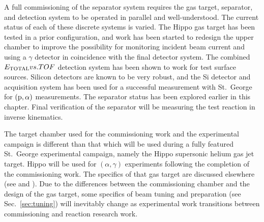 A full commissioning of the separator system requires the gas target,
separator, and detection system to be operated in parallel and well-understood.
The current status of each of these discrete systems is varied. The Hippo gas
target has been tested in a prior configuration, and work has been started to
redesign the upper chamber to improve the possibility for monitoring incident
beam current and using a $\gamma$ detector in coincidence with the final
detector system. The combined $E_{\rm{TOTAL}} vs. TOF$ detection system has
been shown to work for test surface sources. Silicon detectors are known to be
very robust, and the Si detector and acquisition system has been used for
a successful measurement with St.\ George for $(\rm{p},\alpha)$ measurements.
The separator status has been explored earlier in this chapter. Final
verification of the separator will be measuring the test reaction
 in inverse kinematics.

The target chamber used for the commissioning work and the experimental
campaign is different than that which will be used during a fully featured St.\
George experimental campaign, namely the Hippo supersonic helium gas jet
target. Hippo will be used for $(\alpha,\gamma)$ experiments following the
completion of the commissioning work. The specifics of that gas target are
discussed elsewhere (see \cite{Kontos2012} and \cite{Meisel2016}). Due to the
differences between the commissioning chamber and the design of the gas target,
some specifics of beam tuning and preparation (see Sec.~\ref{sec:tuning}) will
inevitably change as experimental work transitions between commissioning and
reaction research work.
